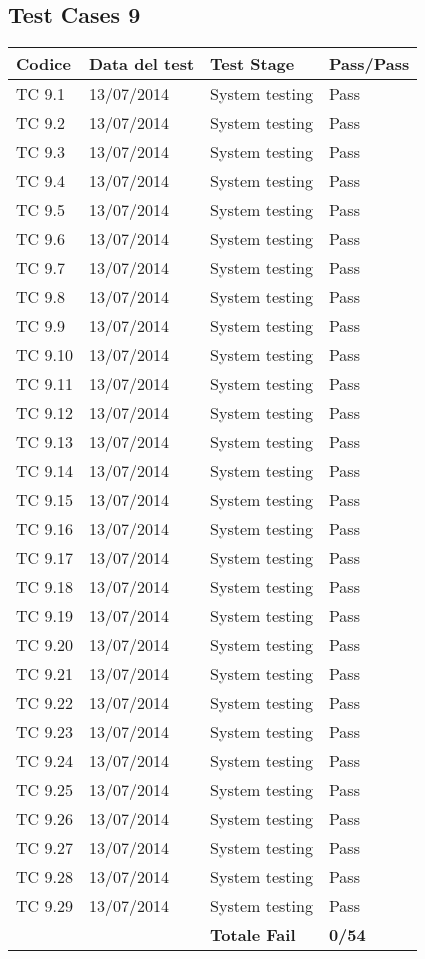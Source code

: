 \subsection{Test Cases 9}

\begin{longtable}{|p{3cm}|p{3cm}|p{3cm}|p{3cm}|}
	\hline
	\rowcolor{Gray}
	\textbf{Codice} & \textbf{Data del test} & \textbf{Test Stage} & \textbf{Pass/Pass}\tabularnewline
	\hline
	TC 9.1			& 13/07/2014 			& System testing		& Pass \tabularnewline
	\hline
	TC 9.2			& 13/07/2014 			& System testing		& Pass \tabularnewline
	\hline
	TC 9.3			& 13/07/2014 			& System testing		& Pass \tabularnewline
	\hline
	TC 9.4			& 13/07/2014 			& System testing		& Pass \tabularnewline
	\hline
	TC 9.5			& 13/07/2014 			& System testing		& Pass \tabularnewline
	\hline
	TC 9.6			& 13/07/2014 			& System testing		& Pass \tabularnewline
	\hline
	TC 9.7			& 13/07/2014 			& System testing		& Pass \tabularnewline
	\hline
	TC 9.8			& 13/07/2014 			& System testing		& Pass \tabularnewline
	\hline
	TC 9.9			& 13/07/2014 			& System testing		& Pass \tabularnewline
	\hline
	TC 9.10			& 13/07/2014 			& System testing		& Pass \tabularnewline
	\hline
	TC 9.11			& 13/07/2014 			& System testing		& Pass \tabularnewline
	\hline
	TC 9.12			& 13/07/2014 			& System testing		& Pass \tabularnewline
	\hline
	TC 9.13			& 13/07/2014 			& System testing		& Pass \tabularnewline
	\hline
	TC 9.14			& 13/07/2014 			& System testing		& Pass \tabularnewline
	\hline
	TC 9.15			& 13/07/2014 			& System testing		& Pass \tabularnewline
	\hline
	TC 9.16			& 13/07/2014 			& System testing		& Pass \tabularnewline
	\hline
	TC 9.17			& 13/07/2014 			& System testing		& Pass \tabularnewline
	\hline
	TC 9.18			& 13/07/2014 			& System testing		& Pass \tabularnewline
	\hline
	TC 9.19			& 13/07/2014 			& System testing		& Pass \tabularnewline
	\hline
	TC 9.20			& 13/07/2014 			& System testing		& Pass \tabularnewline
	\hline
	TC 9.21			& 13/07/2014 			& System testing		& Pass \tabularnewline
	\hline
	TC 9.22			& 13/07/2014 			& System testing		& Pass \tabularnewline
	\hline
	TC 9.23			& 13/07/2014 			& System testing		& Pass \tabularnewline
	\hline
	TC 9.24			& 13/07/2014 			& System testing		& Pass \tabularnewline
	\hline
	TC 9.25			& 13/07/2014 			& System testing		& Pass \tabularnewline
	\hline
	TC 9.26			& 13/07/2014 			& System testing		& Pass \tabularnewline
	\hline
	TC 9.27			& 13/07/2014 			& System testing		& Pass \tabularnewline
	\hline
	TC 9.28			& 13/07/2014 			& System testing		& Pass \tabularnewline
	\hline
	TC 9.29			& 13/07/2014 			& System testing		& Pass \tabularnewline
	\hline
					& 						& \textbf{Totale Fail}	& \textbf{0/54} \tabularnewline
	\hline
\end{longtable}

